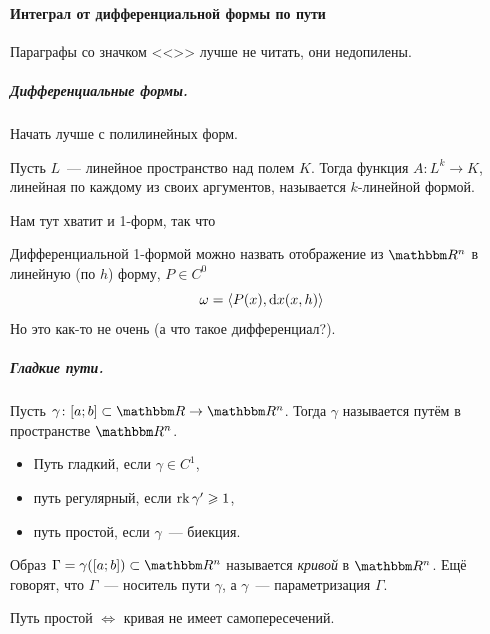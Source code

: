 \documentclass[12pt,timbord]{../../../notes}
\begin{document}
\paragraph{\underdev Интеграл от дифференциальной формы по пути}
\label{par:lineint::defs}
Параграфы со значком  <<\underdev>> лучше не читать, они недопилены.

\subparagraph{Дифференциальные формы.} 
Начать лучше с полилинейных форм.
\begin{defn}\label{defn:lineint::defs::linform}
  Пусть $L$~--- линейное пространство над полем $K$. Тогда функция $A\colon L^k\to K$, линейная по
  каждому из своих аргументов, называется $k$-линейной формой.
\end{defn}


Нам тут хватит и 1-форм, так что
\begin{defn}\label{defn:lineint::defs::diffform}
  Дифференциальной 1-формой можно назвать отображение из $\R^n$ в линейную (по $h$) форму, $P\in C^0$
  \[
    \omega = \langle P(x), \mathrm{d} x(x,h)\rangle
  \]
  Но это как-то не очень ({а что такое дифференциал?}).
\end{defn}

\subparagraph{Гладкие пути.}

\begin{defn}\label{defn:lineint::defs::smoothpath}
  Пусть $\gamma\colon [a;b]\subset \R \to \R^n$. Тогда $\gamma$ называется путём в пространстве
  $\R^n$.
  \begin{itemize}
    \item Путь гладкий, если $\gamma\in C^1$,
    \item путь регулярный, если $\operatorname{rk}\gamma' \geqslant 1$,
    \item путь простой, если $\gamma$~--- биекция.
  \end{itemize}
\end{defn}

\begin{defn}\label{defn:lineint::defs::curve}
  Образ $\Gamma = \gamma([a;b]) \subset \R^n$ называется \emph{кривой} в $\R^n$. Ещё говорят, что
  $\Gamma$~--- носитель пути $\gamma$, а $\gamma$~--- параметризация $\Gamma$.
\end{defn}

\begin{rem*}
  Путь простой $\Leftrightarrow$ кривая не имеет самопересечений.
\end{rem*}
\end{document}
